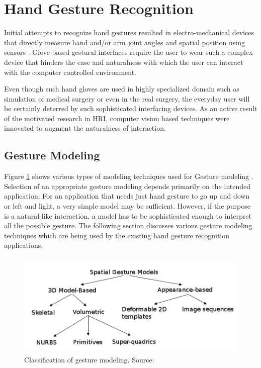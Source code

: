 \section{Hand Gesture Recognition} Initial attempts to recognize hand gestures resulted in electro-mechanical devices that directly measure hand and/or arm joint angles and spatial position using sensors \cite{3}. Glove-based gestural interfaces require the user to wear such a complex device that hinders the ease and naturalness with which the user can interact with the computer controlled environment. 

Even though such hand gloves are used in highly specialized domain such as simulation of medical surgery or even in the real surgery, the everyday user will be certainly deterred by such sophisticated interfacing devices. As an active result of the motivated research in HRI, computer vision based techniques were innovated to augment the naturalness of interaction.

\subsection{Gesture Modeling} Figure \ref{fig:ges:model} shows various types of modeling techniques used for Gesture modeling \cite{3}. Selection of an appropriate gesture modeling depends primarily on the intended application. For an application that needs just hand gesture to go up and down or left and light, a very simple model may be sufficient. However, if the purpose is a natural-like interaction, a model has to be sophisticated enough to interpret all the possible gesture. The following section discusses various gesture modeling techniques which are being used by the existing hand gesture recognition applications. 

\begin{figure}
	[h] \centering 
	\includegraphics[height=5cm]{figures/ges-model.png} 
	\caption{Classification of gesture modeling. Source: \cite{10}}
	\label{fig:ges:model} 
\end{figure}

